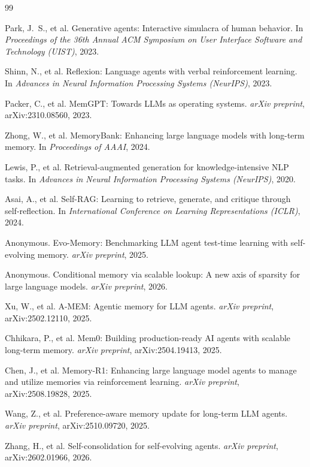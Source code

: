 \documentclass[11pt,a4paper]{article}
\begin{document}
\begin{thebibliography}{99}

Park, J.~S., et al.
\newblock Generative agents: Interactive simulacra of human behavior.
\newblock In \textit{Proceedings of the 36th Annual ACM Symposium on User
  Interface Software and Technology (UIST)}, 2023.

Shinn, N., et al.
\newblock Reflexion: Language agents with verbal reinforcement learning.
\newblock In \textit{Advances in Neural Information Processing Systems
  (NeurIPS)}, 2023.

Packer, C., et al.
\newblock MemGPT: Towards LLMs as operating systems.
\newblock \textit{arXiv preprint}, arXiv:2310.08560, 2023.

Zhong, W., et al.
\newblock MemoryBank: Enhancing large language models with long-term memory.
\newblock In \textit{Proceedings of AAAI}, 2024.

Lewis, P., et al.
\newblock Retrieval-augmented generation for knowledge-intensive NLP tasks.
\newblock In \textit{Advances in Neural Information Processing Systems
  (NeurIPS)}, 2020.

Asai, A., et al.
\newblock Self-RAG: Learning to retrieve, generate, and critique through
  self-reflection.
\newblock In \textit{International Conference on Learning Representations
  (ICLR)}, 2024.

Anonymous.
\newblock Evo-Memory: Benchmarking LLM agent test-time learning with
  self-evolving memory.
\newblock \textit{arXiv preprint}, 2025.

Anonymous.
\newblock Conditional memory via scalable lookup: A new axis of sparsity for
  large language models.
\newblock \textit{arXiv preprint}, 2026.

Xu, W., et al.
\newblock A-MEM: Agentic memory for LLM agents.
\newblock \textit{arXiv preprint}, arXiv:2502.12110, 2025.

Chhikara, P., et al.
\newblock Mem0: Building production-ready AI agents with scalable long-term
  memory.
\newblock \textit{arXiv preprint}, arXiv:2504.19413, 2025.

Chen, J., et al.
\newblock Memory-R1: Enhancing large language model agents to manage and
  utilize memories via reinforcement learning.
\newblock \textit{arXiv preprint}, arXiv:2508.19828, 2025.

Wang, Z., et al.
\newblock Preference-aware memory update for long-term LLM agents.
\newblock \textit{arXiv preprint}, arXiv:2510.09720, 2025.

Zhang, H., et al.
\newblock Self-consolidation for self-evolving agents.
\newblock \textit{arXiv preprint}, arXiv:2602.01966, 2026.

\end{thebibliography}
\end{document}
